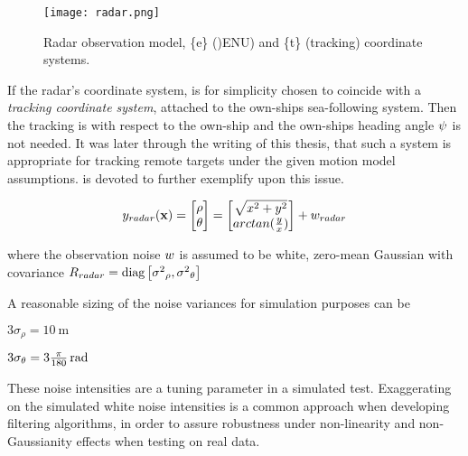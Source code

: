 \begin{figure}[H]
	\centering
	\texttt{[image: radar.png]}
	\caption{Radar observation model, \{e\} ()ENU) and \{t\} (tracking) coordinate systems.}
	\label{fig:radar_observation_model}
\end{figure}


If the radar's coordinate system, is for simplicity  chosen to coincide with a \emph{tracking coordinate system},  attached to the own-ships sea-following system. Then the tracking is with respect to the own-ship and the own-ships heading angle ${\psi}$ is not needed. It was later through the writing of this thesis, that such a system is appropriate for tracking remote targets under the given motion model assumptions.  is devoted to further exemplify upon this issue.


\begin{equation}
{{y}}_{radar}(\mathbf{x}) = \begin{bmatrix}
\rho \\
\theta
\end{bmatrix} = \begin{bmatrix}
\sqrt{x^2 + y^2} \\
arctan(\frac{y}{x})
\end{bmatrix} + {w}_{radar}
\end{equation}


where the observation noise ${w}$ is assumed to be white, zero-mean Gaussian with covariance ${R}_{radar} = \text{diag}\left[{\sigma^2}_{\rho}, {\sigma^2}_{\theta}\right] $



A reasonable sizing of the noise variances for simulation purposes can be
\begin{description}
	\item $3\sigma_\rho = \SI{10}{\meter}$
	\item $3\sigma_\theta = \SI[parse-numbers=false]{3\frac{\pi}{180}}{\radian}  $
\end{description}

These noise intensities are a tuning parameter in a simulated test. Exaggerating on the simulated white noise intensities is a common approach when developing filtering algorithms, in order to assure robustness under non-linearity and non-Gaussianity effects when testing on real data.

